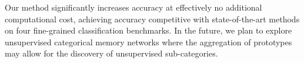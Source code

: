 \documentclass[journal]{IEEEtran}
\begin{document}
Our method significantly increases accuracy at effectively no additional computational cost, achieving accuracy competitive with state-of-the-art methods on four fine-grained classification benchmarks. In the future, we plan to explore unsupervised categorical memory networks where the aggregation of prototypes may allow for the discovery of unsupervised sub-categories.




\end{document}

